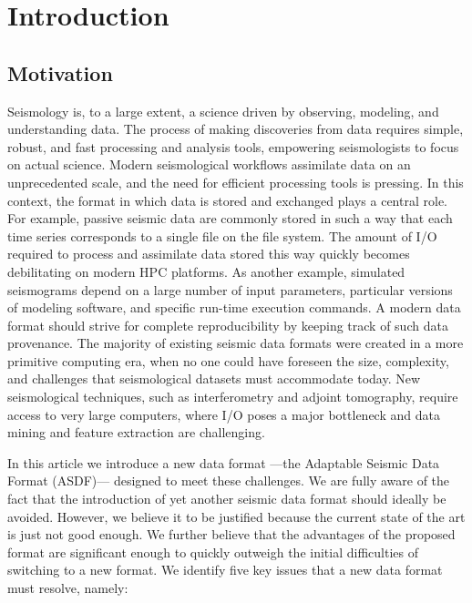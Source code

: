 \section{Introduction}

\subsection{Motivation}

Seismology is, to a large extent, a science driven by observing, modeling, and
understanding data.  The process of making discoveries from data requires
simple, robust, and fast processing and analysis tools, empowering
seismologists to focus on actual science.  Modern seismological workflows
assimilate data on an unprecedented scale, and the need for efficient
processing tools is pressing.  In this context, the format in which data is
stored and exchanged plays a central role.  For example, passive seismic data
are commonly stored in such a way that each time series corresponds to a single
file on the file system.  The amount of I/O required to process and assimilate
data stored this way quickly becomes debilitating on modern HPC platforms.  As
another example, simulated seismograms depend on a large number of input
parameters, particular versions of modeling software, and specific run-time
execution commands.  A modern data format should strive for complete
reproducibility by keeping track of such data provenance.
The majority of existing seismic data formats were created in a more primitive
computing era, when no one could have foreseen the size, complexity, and
challenges that seismological datasets must accommodate today.
New seismological techniques, such as interferometry and adjoint tomography,
require access to very large computers, where I/O poses a major bottleneck and
data mining and feature extraction are challenging.

In this article we introduce a new data format ---the Adaptable Seismic Data
Format (ASDF)--- designed to meet these challenges.  We are fully
aware of the fact that the introduction of yet another seismic data format
should ideally be avoided.  However, we believe it to be justified because the
current state of the art is just not good enough. We further believe that the
advantages of the proposed format are significant enough to quickly outweigh
the initial difficulties of switching to a new format.
We identify five key issues that a new data format must resolve, namely:

